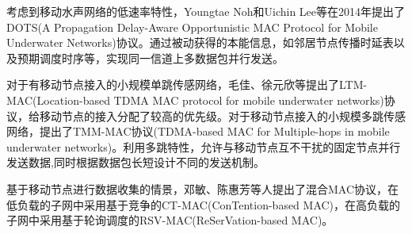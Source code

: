 考虑到移动水声网络的低速率特性，Youngtae Noh和Uichin Lee等在2014年提出了DOTS(A Propagation Delay-Aware Opportunistic MAC Protocol for Mobile Underwater Networks)协议。通过被动获得的本能信息，如邻居节点传播时延表以及预期调度时序等，实现同一信道上多数据包并行发送。\cite{DOTS: A Propagation Delay-Aware Opportunistic MAC Protocol for Mobile Underwater Networks}

对于有移动节点接入的小规模单跳传感网络，毛佳、徐元欣等提出了LTM-MAC(Location-based TDMA MAC protocol for mobile underwater networks)\cite{LTM-MAC: A location-based TDMA MAC protocol for mobile underwater networks}协议，给移动节点的接入分配了较高的优先级。对于移动节点接入的小规模多跳传感网络，提出了TMM-MAC协议(TDMA-based MAC for Multiple-hops in mobile underwater networks)。利用多跳特性，允许与移动节点互不干扰的固定节点并行发送数据,同时根据数据包长短设计不同的发送机制。

基于移动节点进行数据收集的情景，邓敏、陈惠芳等人提出了混合MAC协议\cite{A Hybrid MAC Protocol in Data-collection-oriented
	Underwater Acoustic Sensor Networks}，在低负载的子网中采用基于竞争的CT-MAC(ConTention-based MAC)，在高负载的子网中采用基于轮询调度的RSV-MAC(ReSerVation-based MAC)。



\endinput